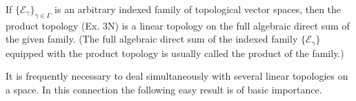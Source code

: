 If $\{\mathcal{E}_\gamma\}_{\gamma \in \Gamma}$ is an arbitrary indexed family of topological vector spaces, then the product topology (Ex. 3N) is a linear topology on the full algebraic direct sum of the given family. (The full algebraic direct sum of the indexed family $\{\mathcal{E}_\gamma\}$ equipped with the product topology is usually called the product of the family.)

It is frequently necessary to deal simultaneously with several linear topologies on a space. In this connection the following easy result is of basic importance.
